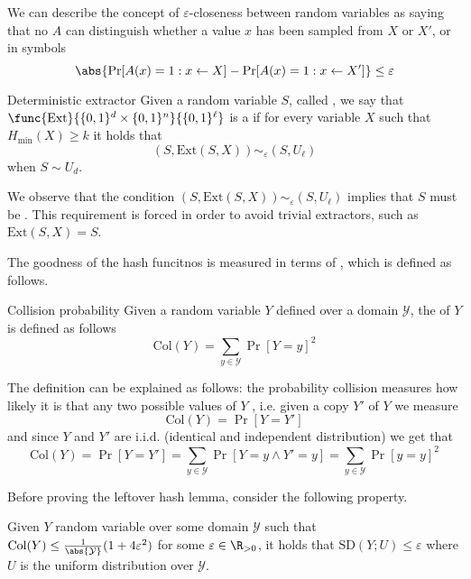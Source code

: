 \documentclass[a4paper, 12pt]{report}
\begin{document}
We can describe the concept of $\varepsilon$-closeness between random variables as saying that no  $A$ can distinguish whether a value $x$ has been sampled from $X$ or $X'$, or in symbols $$\abs{\Pr[A(x) = 1 : x \leftarrow X] - \Pr[A(x) = 1: x \leftarrow X']} \le \varepsilon$$

\begin{frameddefn}{Deterministic extractor}
	Given a random variable $S$, called , we say that $\func{\mbox{Ext}}{\{0, 1\}^d \times \{0, 1\}^n}{\{0, 1\}^\ell}$ is a  if for every variable $X$ such that $H_\mathrm{min}(X) \ge k$ it holds that $$(S, \mathrm{Ext}(S, X)) \sim_\varepsilon (S, U_\ell)$$ when $S \sim U_d$.
\end{frameddefn}

We observe that the condition $(S, \mathrm{Ext}(S, X)) \sim_\varepsilon (S, U_\ell)$ implies that $S$ must be  . This requirement is forced in order to avoid trivial extractors, such as $\mbox{Ext}(S, X) = S$. 

The goodness of the hash funcitnos is measured in terms of , which is defined as follows.

\begin{frameddefn}{Collision probability}
	Given a random variable $Y$ defined over a domain $\mathcal Y$, the  of $Y$ is defined as follows $$\mbox{Col}(Y) = \sum_{y \in \mathcal Y}{\Pr[Y = y]^2}$$
\end{frameddefn}

The definition can be explained as follows: the probability collision measures how likely it is that any two possible values of $Y$ , i.e. given a copy $Y'$ of $Y$ we measure $$\mbox{Col}(Y) = \Pr[Y = Y']$$ and since $Y$ and $Y'$ are i.i.d. (identical and independent distribution) we get that $$\mbox{Col}(Y) = \Pr[Y = Y'] = \sum_{y \in \mathcal Y}{\Pr[Y = y \land Y' = y]} = \sum_{y \in \mathcal Y}{\Pr[y = y]^2}$$

Before proving the leftover hash lemma, consider the following property.

\begin{framedprop}{}
	Given $Y$ random variable over some domain $\mathcal Y$ such that $\mbox{Col}(Y) \le \tfrac{1}{\abs{\mathcal Y}}(1 + 4 \varepsilon^2)$ for some $\varepsilon \in \R_{>0}$, it holds that $\mbox{SD}(Y;U) \le \varepsilon$ where $U$ is the uniform distribution over $\mathcal Y$.
\end{framedprop}
\end{document}
